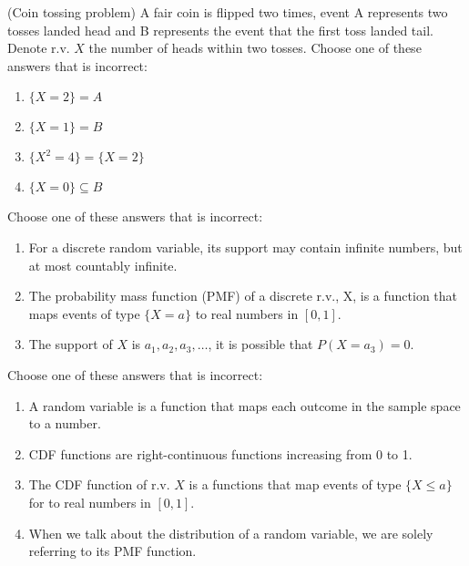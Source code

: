 \documentclass[poll_tutorial_format]{subfiles}
\begin{document}
	
	
	\begin{exercise}
		(Coin tossing problem) A fair coin is flipped two times, event A represents two tosses landed head and B represents the event that the first toss landed tail. Denote r.v. $X$ the number of heads within two tosses.
		Choose one of these answers that is incorrect: %
		\begin{enumerate}
			\item $\{X=2\}=A$
			\item $ \{X=1\}=B$
			\item $\{X^2 =4\} =\{X=2\} $
			\item $ \{X=0\} \subseteq B$
		\end{enumerate}
	\end{exercise}
	
	
	
	\begin{exercise}
		Choose one of these answers that is incorrect:%
		\begin{enumerate}
			\item For a discrete random variable, its support may contain infinite numbers, but at most countably infinite.
			\item The probability mass function
			(PMF) of a discrete r.v., X, is a function that maps events of type $\{X=a\}$  to real numbers in $[0,1]$.
			\item The support of $X$ is $a_1, a_2, a_3, \dots$, it is possible that $P(X=a_{3})=0$.
		\end{enumerate}
	\end{exercise}
	
	
	\begin{exercise}
		Choose one of these answers that is incorrect:%
		\begin{enumerate}
			\item A random variable is a function that maps each outcome in the sample space to a number.  
			\item CDF functions are right-continuous functions increasing from 0 to 1.
			\item The CDF function of r.v. $X$ is a functions that map events of type $\{X\leq a\}$  for  to real numbers in $[0,1]$.
			\item When we talk about the distribution of a random variable, we are solely referring to its PMF function.
		\end{enumerate}
	\end{exercise}
	
\end{document}
